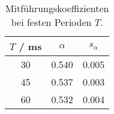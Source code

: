 \begin{table}[H]
\caption{Mitf\"uhrungskoeffizienten bei festen Perioden $T$. }
\begin{center}
\begin{tabular}{|c|c|c|}
  \hline
  $T$ / ms & $\alpha$ & $s_{\alpha}$ \\ \hline
  30 & 0.540 & 0.005 \\ \hline
  45 & 0.537 & 0.003 \\ \hline
  60 & 0.532 & 0.004 \\ \hline
\end{tabular}
\end{center}
\label{tab:x0:alpha}
\end{table}
